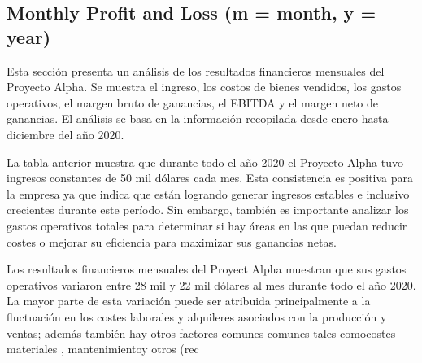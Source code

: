 

\subsection{Monthly Profit and Loss (m = month, y = year)}\label{sec:title}

Esta sección presenta un análisis de los resultados financieros mensuales del Proyecto Alpha. Se muestra el ingreso, los costos de bienes vendidos, los gastos operativos, el margen bruto de ganancias, el EBITDA y el margen neto de ganancias. El análisis se basa en la información recopilada desde enero hasta diciembre del año 2020. 


La tabla anterior muestra que durante todo el año 2020 el Proyecto Alpha tuvo ingresos constantes de 50 mil dólares cada mes. Esta consistencia es positiva para la empresa ya que indica que están logrando generar ingresos estables e inclusivo crecientes durante este período. Sin embargo, también es importante analizar los gastos operativos totales para determinar si hay áreas en las que puedan reducir costes o mejorar su eficiencia para maximizar sus ganancias netas. 

Los resultados financieros mensuales del Proyect Alpha muestran que sus gastos operativos variaron entre 28 mil y 22 mil dólares al mes durante todo el año 2020. La mayor parte de esta variación puede ser atribuida principalmente a la fluctuación en los costes laborales y alquileres asociados con la producción y ventas; además también hay otros factores comunes comunes tales comocostes materiales , mantenimientoy otros (rec